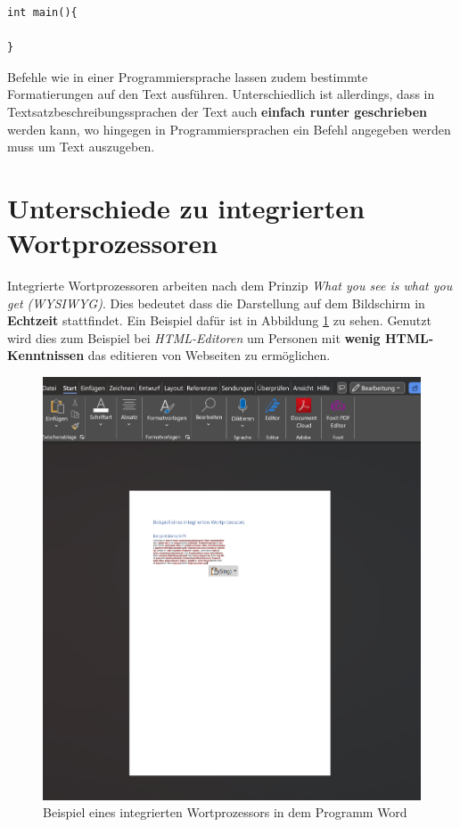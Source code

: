 \begin{lstlisting}
int main(){

} 
\end{lstlisting}
Befehle wie in einer Programmiersprache lassen zudem bestimmte Formatierungen auf den Text ausführen.
Unterschiedlich ist allerdings, dass in Textsatzbeschreibungssprachen der Text auch \textbf{einfach runter geschrieben} werden kann, wo hingegen in Programmiersprachen ein Befehl angegeben werden muss um Text auszugeben.

\section{Unterschiede zu integrierten Wortprozessoren}
Integrierte Wortprozessoren arbeiten nach dem Prinzip \textit{What you see is what you get (WYSIWYG)}.
Dies bedeutet dass die Darstellung auf dem Bildschirm in \textbf{Echtzeit} stattfindet.
Ein Beispiel dafür ist in Abbildung \ref{Wortprozessor} zu sehen.
Genutzt wird dies zum Beispiel bei \textit{HTML-Editoren} um Personen mit \textbf{wenig HTML-Kenntnissen} das editieren von Webseiten zu ermöglichen.

\begin{figure}[h]
	\centering
	\includegraphics[scale=0.5]{Images/Wortprozessor.png}
	\caption{Beispiel eines integrierten Wortprozessors in dem Programm Word}
	\label{Wortprozessor}
\end{figure}

